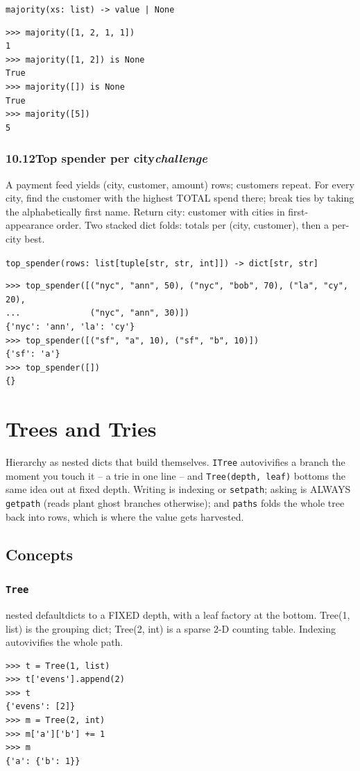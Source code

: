 \documentclass[10pt,letterpaper]{book}
\begin{document}
\noindent\texttt{majority(xs: list) -> value | None}
\begin{lstlisting}[style=ex]
>>> majority([1, 2, 1, 1])
1
>>> majority([1, 2]) is None
True
>>> majority([]) is None
True
>>> majority([5])
5
\end{lstlisting}
\subsection*{10.12\quad Top spender per city\hfill\textnormal{\textit{challenge}}}
A payment feed yields (city, customer, amount) rows; customers repeat. For every city, find the customer with the highest TOTAL spend there; break ties by taking the alphabetically first name. Return {city: customer} with cities in first-appearance order. Two stacked dict folds: totals per (city, customer), then a per-city best.

\noindent\texttt{top\_spender(rows: list[tuple[str, str, int]]) -> dict[str, str]}
\begin{lstlisting}[style=ex]
>>> top_spender([("nyc", "ann", 50), ("nyc", "bob", 70), ("la", "cy", 20),
...              ("nyc", "ann", 30)])
{'nyc': 'ann', 'la': 'cy'}
>>> top_spender([("sf", "a", 10), ("sf", "b", 10)])
{'sf': 'a'}
>>> top_spender([])
{}
\end{lstlisting}

\clearpage
\chapter{Trees and Tries}

Hierarchy as nested dicts that build themselves. \texttt{ITree} autovivifies
a branch the moment you touch it -- a trie in one line -- and
\texttt{Tree(depth, leaf)} bottoms the same idea out at fixed depth.
Writing is indexing or \texttt{setpath}; asking is ALWAYS \texttt{getpath}
(reads plant ghost branches otherwise); and \texttt{paths} folds the whole
tree back into rows, which is where the value gets harvested.
\section{Concepts}
\subsection{\texttt{Tree}}\label{def:Tree}
nested defaultdicts to a FIXED depth, with a leaf factory at the bottom. Tree(1, list) is the grouping dict; Tree(2, int) is a sparse 2-D counting table. Indexing autovivifies the whole path.
\begin{lstlisting}[style=ex]
>>> t = Tree(1, list)
>>> t['evens'].append(2)
>>> t
{'evens': [2]}
>>> m = Tree(2, int)
>>> m['a']['b'] += 1
>>> m
{'a': {'b': 1}}
\end{lstlisting}
\end{document}
